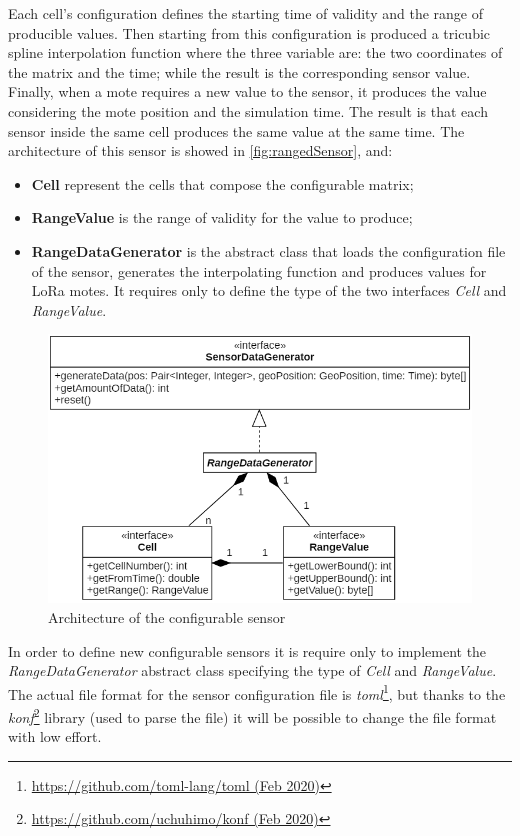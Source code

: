 Each cell's configuration defines the starting time of validity and the range of producible values. 
Then starting from this configuration is produced a tricubic spline interpolation function where the three variable are: the two coordinates of the matrix and the time; while the result is the corresponding sensor value.
Finally, when a mote requires a new value to the sensor, it produces the value considering the mote position and the simulation time.
The result is that each sensor inside the same cell produces the same value at the same time. 
The architecture of this sensor is showed in \autoref{fig:rangedSensor}, and:
\begin{itemize}
    \item \textbf{Cell} represent the cells that compose the configurable matrix;
    \item \textbf{RangeValue} is the range of validity for the value to produce;
    \item \textbf{RangeDataGenerator} is the abstract class that loads the configuration file of the sensor, generates the interpolating function and produces values for LoRa motes. It requires only to define the type of the two interfaces \textit{Cell} and \textit{RangeValue}.
\end{itemize}
% 
\begin{figure}[h]
    \centering
    \includegraphics[scale=0.7]{figures/rangedSensor.png}
    \caption{Architecture of the configurable sensor}
    \label{fig:rangedSensor}
\end{figure}
% 
In order to define new configurable sensors it is require only to implement the \mbox{\textit{RangeDataGenerator}} abstract class specifying the type of \mbox{\textit{Cell}} and \mbox{\textit{RangeValue}}.
The actual file format for the sensor configuration file is \textit{toml}\footnote{\href{https://github.com/toml-lang/toml}{https://github.com/toml-lang/toml (Feb 2020)}}, but thanks to the \textit{konf}\footnote{\href{https://github.com/uchuhimo/konf}{https://github.com/uchuhimo/konf (Feb 2020)}} library (used to parse the file) it will be possible to change the file format with low effort.

